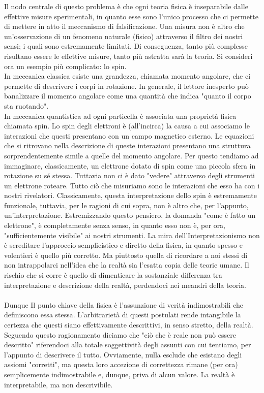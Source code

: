 \documentclass[]{scrbook}
\begin{document}
	Il nodo centrale di questo problema è che ogni teoria fisica è inseparabile dalle effettive misure sperimentali, in quanto esse sono l'unico processo che ci permette di mettere in atto il meccanismo di falsificazione. Una misura non è altro che un'osservazione di un fenomeno naturale (fisico) attraverso il filtro dei nostri sensi; i quali sono estremamente limitati. Di conseguenza, tanto più complesse risultano essere le effettive misure, tanto più astratta sarà la teoria. Si consideri ora un esempio più complicato: lo spin.\\
	In meccanica classica esiste una grandezza, chiamata momento angolare, che ci permette di descrivere i corpi in rotazione. In generale, il lettore inesperto può banalizzare il momento angolare come una quantità che indica "quanto il corpo sta ruotando".\\
	In meccanica quantistica ad ogni particella è associata una proprietà fisica chiamata spin. Lo spin degli elettroni è (all'incirca) la causa a cui associamo le interazioni che questi presentano con un campo magnetico esterno. Le equazioni che si ritrovano nella descrizione di queste interazioni presentano una struttura sorprendentemente simile a quelle del momento angolare. Per questo tendiamo ad immaginare, classicamente, un elettrone dotato di spin come una piccola sfera in rotazione su sé stessa. Tuttavia non ci è dato "vedere" attraverso degli strumenti un elettrone roteare. Tutto ciò che misuriamo sono le interazioni che esso ha con i nostri rivelatori. Classicamente, questa interpretazione dello spin è estremamente funzionale, tuttavia, per le ragioni di cui sopra, non è altro che, per l'appunto, un'interpretazione. Estremizzando questo pensiero, la domanda "come è fatto un elettrone", è completamente senza senso, in quanto esso non è, per ora, "sufficientemente visibile" ai nostri strumenti. La mira dell'Interpretazionismo non è screditare l'approccio semplicistico e diretto della fisica, in quanto spesso e volentieri è quello più corretto. Ma piuttosto quella di ricordare a noi stessi di non intrappolarci nell'idea che la realtà sia l'esatta copia delle teorie umane.  
	Il rischio che si corre è quello di dimenticare la sostanziale differenza tra interpretazione e descrizione della realtà, perdendoci nei meandri della teoria.\\
	\\
	Dunque Il punto chiave della fisica è l'assunzione di verità indimostrabili che definiscono essa stessa. L'arbitrarietà di questi postulati rende intangibile la certezza che questi siano effettivamente descrittivi, in senso stretto, della realtà. Seguendo questo ragionamento diciamo che "ciò che è reale non può essere descritto" riferendoci alla totale soggettività degli assunti con cui tentiamo, per l'appunto di descrivere il tutto. Ovviamente, nulla esclude che esistano degli assiomi "corretti", ma questa loro accezione di correttezza rimane (per ora) semplicemente indimostrabile e, dunque, priva di alcun valore. La realtà è interpretabile, ma non descrivibile.
\end{document}
